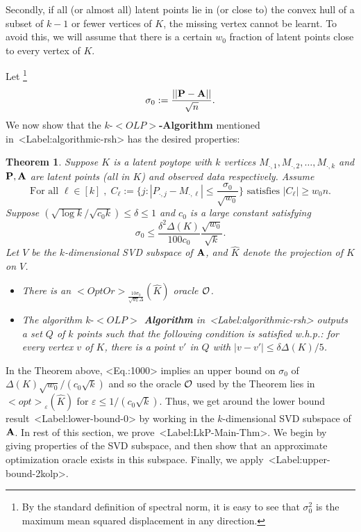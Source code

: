 \documentclass[11pt,letterpaper]{article}
\newcounter{note}[section]
\def\textsf#1{<#1>}%
\def\mathsf#1{<#1>}%
\def\xspace{}%
\def\Cref#1{<Label:#1>}%
\def\eqref#1{<Eq.:#1>}%
\newtheorem{theorem}{Theorem}[section]
\theoremstyle{definition}
\theoremstyle{remark}
\newcommand{\opt}{{\textsf{opt}}}
\newcommand{\bP}{{\bf P}}
\newcommand{\bA}{{\bf A}}
\newcommand{\hatK}{{\widehat K}}
\newcommand{\olp}{{\mathsf {OLP}}\xspace}
\newcommand{\kolp}{k\mbox{-}\olp}
\newcommand{\opto}{{\mathsf{OptOr}}}
\begin{document}
Secondly, if all (or almost all) latent points lie in (or close to) the convex hull of a subset of $k-1$ or fewer vertices of $K$, the missing vertex cannot be learnt. To avoid this, we will assume that there is a certain $w_0$ fraction of latent points close to every vertex of $K$. 

Let \footnote{By the standard definition of spectral norm, it is easy to see that $\sigma_0^2$ is the maximum mean squared displacement in any direction.}
\begin{equation}
\label{eq:p}
\sigma_0 :=\frac{||\bP-\bA||}{\sqrt n}.
\end{equation}
We now show that the {\bf $\kolp$-Algorithm} mentioned in~\Cref{algorithmic-rsh}
has the desired properties: 
\begin{theorem}\label{LkP-Main-Thm}
Suppose $K$ is a latent poytope with $k$ vertices $M_{\cdot,1},M_{\cdot,2},\ldots ,M_{\cdot, k}$ and $\bP,\bA$ are latent points (all in $K$) and observed data respectively. Assume 
\begin{equation}\label{eq:cell}
\mbox{For all }\ell\in[k]\; ,\; C_\ell :=\{j:|P_{\cdot,j}-M_{\cdot,\ell}|\leq\frac{\sigma_0}{\sqrt{w_0}}\} \mbox{ satisfies    }
|C_\ell|\geq w_0n.
\end{equation}
Suppose $(\sqrt{\log k}/\sqrt{c_0k})\leq \delta\leq 1$ and $c_0$ is a large constant satisfying
\begin{equation}\label{1000}
\sigma_0\leq \frac{\delta^2\Delta(K)}{100c_0}\frac{\sqrt{w_0}}{\sqrt k}.
\end{equation}
Let $V$ be the $k$-dimensional SVD subspace of $\bf A$, and $\hatK$ denote the projection of $K$ on $V$. 
\begin{itemize}
    \item There is an $ \opto_{\frac{10\sigma_0}{\sqrt{w_0}\Delta}}(\hatK)$ oracle $\cal O$. 
    \item The algorithm {\bf $\kolp$ Algorithm} in~\Cref{algorithmic-rsh} outputs a set $Q$ of $k$ points such that the following condition is satisfied w.h.p.:  for every vertex $v$ of $K$, there is a point $v'$ in $Q$ with $|v-v'| \leq \delta \Delta(K)/5$. 
\end{itemize}
\end{theorem}

In the Theorem above, \eqref{1000}  implies an upper bound on $\sigma_0$ of $\Delta(K)\sqrt{w_0}/(c_0\sqrt k)$ and so the  oracle $\cal O$ used by the Theorem lies in $\opt_\varepsilon(\hatK)$ for  $\varepsilon\leq 1/(c_0\sqrt k)$. Thus, we get around the lower bound result~\Cref{lower-bound-0} by working in the $k$-dimensional SVD subspace of $\bA$. In rest of this section, we prove~\Cref{LkP-Main-Thm}. We begin by giving properties of the SVD subspace, and then show that an approximate optimization oracle exists in this subspace. Finally, we apply~\Cref{upper-bound-2kolp}.
\end{document}
